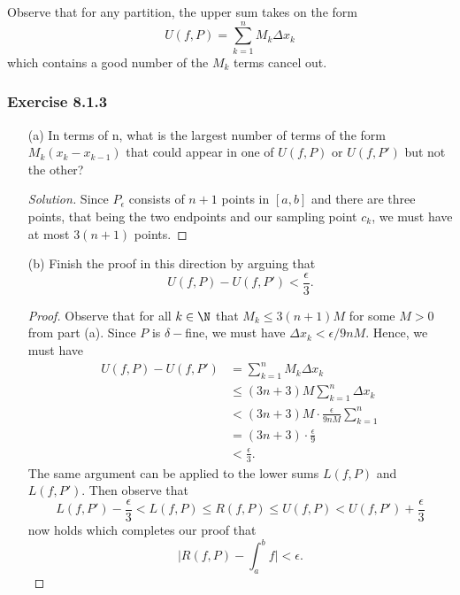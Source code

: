 Observe that for any partition, the upper sum takes on the form 
\[  U(f,P) = \sum_{ k=1 }^{ n } M_{k } \Delta x_{k } \] which contains a good number of the \( M_{k }  \) terms cancel out.
\subsubsection{Exercise 8.1.3 } 
\begin{enumerate}
    \item[(a)] In terms of n, what is the largest number of terms of the form \( M_{k} ( x_{k } - x_{k-1} ) \) that could appear in one of \( U(f,P)  \) or \( U(f,P') \) but not the other?
        \begin{proof}[Solution]
            Since \( P_{\epsilon } \) consists of \( n+1  \) points in \( [a,b]  \) and there are three points, that being the two endpoints and our sampling point \( c_{k }  \), we must have at most \( 3(n+1)  \) points.
        \end{proof}
    \item[(b)] Finish the proof in this direction by arguing that 
        \[  U(f,P) - U(f,P') < \frac{ \epsilon  }{ 3 }. \]
        \begin{proof}
        Observe that for all \( k \in \N  \) that \( M_{ k } \leq 3(n+1)M   \) for some \( M > 0  \) from part (a). Since \( P  \) is \( \delta- \)fine, we must have \( \Delta x_{k } < \epsilon / 9nM \). Hence, we must have   
        \begin{align*}
            U(f,P) - U(f, P') &= \sum_{ k=1  }^{ n  } M_{k } \Delta x_{ k }  \\
                              &\leq (3n+3)M \sum_{ k=1 }^{ n } \Delta x_{k } \\  
                              &< (3n+3)M \cdot \frac{ \epsilon  }{ 9nM  } \sum_{ k=1 }^{ n } \\
                              &= (3n+3) \cdot \frac{ \epsilon  }{ 9  } \\ 
                              &< \frac{ \epsilon  }{ 3 }.
        \end{align*}
        The same argument can be applied to the lower sums \( L(f,P)  \) and \( L(f,P') \). Then observe that 
        \[   L(f,P') - \frac{ \epsilon  }{ 3 } <  L(f,P) \leq R(f,P) \leq U(f,P) < U(f,P') + \frac{ \epsilon  }{ 3 }  \] now holds which completes our proof that 
        \[ \Big| R(f,P) - \int_{ a }^{ b } f  \Big| < \epsilon. \]
        \end{proof}
\end{enumerate}





